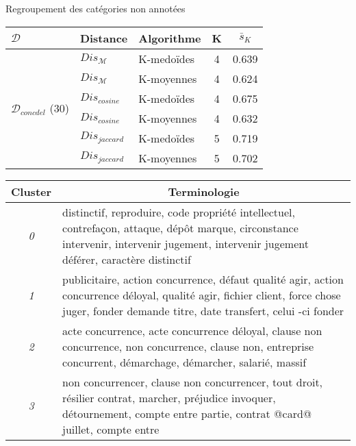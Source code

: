 \begin{frame}[c]{\mysubsectiontitle}
	Regroupement des catégories non annotées
	
	\newlength{\mrcell}
	\setlength{\mrcell}{0.8cm}
	\begin{table}[!htb]
		\tiny
		\begin{center}						
				\begin{tabular}[pos]{|l|l|l|c|c|}
					\hline
					$\mathcal{D}$& Distance & Algorithme& {K}  & $\bar{s}_K$  \\ \hline
					\multirow{6}{\mrcell}{$\mathcal{D}_{concdel}$ (30)}  & $Dis_\mathcal{M}$ & K-medoïdes & 4 & 0.639  \\ \cline{2-5}
					& $Dis_\mathcal{M}$ & K-moyennes & 4 & 0.624  \\ \cline{2-5}
					& $Dis_{cosine}$ & K-medoïdes & 4 & 0.675  \\ \cline{2-5}
					& $Dis_{cosine}$ & K-moyennes & 4 & 0.632  \\ \cline{2-5}
					& $Dis_{jaccard}$ & K-medoïdes & 5 & 0.719  \\ \cline{2-5}
					& $Dis_{jaccard}$ & K-moyennes & 5 & 0.702\\ \hline
				\end{tabular}
		\end{center}						
	\end{table}
	\begin{table}[ht]
		\centering \tiny
		\begin{tabular}{|c|p{}|}
			\hline
			{Cluster} & \multicolumn{1}{c|}{Terminologie} \\ \hline
			\textit{0} & distinctif, reproduire, code propriété intellectuel, contrefaçon, attaque, dépôt marque, circonstance intervenir, intervenir jugement, intervenir jugement déférer, caractère distinctif
			\\ \hline
			\textit{1} & publicitaire, action concurrence, défaut qualité agir, action concurrence déloyal, qualité agir, fichier client, force chose juger, fonder demande titre, date transfert, celui -ci fonder
			\\ \hline
			\textit{2} & acte concurrence, acte concurrence déloyal, clause non concurrence, non concurrence, clause non, entreprise concurrent, démarchage, démarcher, salarié, massif
			\\ \hline
			\textit{3} & non concurrencer, clause non concurrencer, tout droit, résilier contrat, marcher, préjudice invoquer, détournement, compte entre partie, contrat @card@ juillet, compte entre
			\\ \hline
		\end{tabular}
		
	\end{table}
\end{frame}

